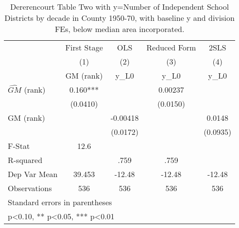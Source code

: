 \begin{table}[htbp]\centering
\def\sym#1{\ifmmode^{#1}\else\(^{#1}\)\fi}
\caption{Dererencourt Table Two with y=Number of Independent School Districts by decade in County 1950-70, with baseline y and division FEs, below median area incorporated.}
\begin{tabular}{l*{4}{c}}
\toprule
                    & First Stage   &         OLS   &Reduced Form   &        2SLS   \\
                    &\multicolumn{1}{c}{(1)}&\multicolumn{1}{c}{(2)}&\multicolumn{1}{c}{(3)}&\multicolumn{1}{c}{(4)}\\
                    &\multicolumn{1}{c}{GM  (rank)}&\multicolumn{1}{c}{y\_L0}&\multicolumn{1}{c}{y\_L0}&\multicolumn{1}{c}{y\_L0}\\
\midrule
$\hat{GM}$ (rank)   &       0.160***&               &     0.00237   &               \\
                    &    (0.0410)   &               &    (0.0150)   &               \\
\addlinespace
GM  (rank)          &               &    -0.00418   &               &      0.0148   \\
                    &               &    (0.0172)   &               &    (0.0935)   \\
\midrule
F-Stat              &        12.6   &               &               &               \\
R-squared           &               &        .759   &        .759   &               \\
Dep Var Mean        &      39.453   &      -12.48   &      -12.48   &      -12.48   \\
Observations        &         536   &         536   &         536   &         536   \\
\bottomrule
\multicolumn{5}{l}{\footnotesize Standard errors in parentheses}\\
\multicolumn{5}{l}{\footnotesize * p<0.10, ** p<0.05, *** p<0.01}\\
\end{tabular}
\end{table}
